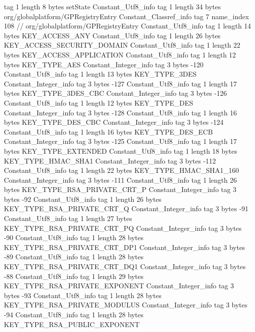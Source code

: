 {{{			tag	1
			length	8
			bytes	setState
		}
		Constant_Utf8_info {
			tag	1
			length	34
			bytes	org/globalplatform/GPRegistryEntry
		}
		Constant_Classref_info {
			tag	7
			name_index	108		// org/globalplatform/GPRegistryEntry
		}
		Constant_Utf8_info {
			tag	1
			length	14
			bytes	KEY_ACCESS_ANY
		}
		Constant_Utf8_info {
			tag	1
			length	26
			bytes	KEY_ACCESS_SECURITY_DOMAIN
		}
		Constant_Utf8_info {
			tag	1
			length	22
			bytes	KEY_ACCESS_APPLICATION
		}
		Constant_Utf8_info {
			tag	1
			length	12
			bytes	KEY_TYPE_AES
		}
		Constant_Integer_info {
			tag	3
			bytes	-120
		}
		Constant_Utf8_info {
			tag	1
			length	13
			bytes	KEY_TYPE_3DES
		}
		Constant_Integer_info {
			tag	3
			bytes	-127
		}
		Constant_Utf8_info {
			tag	1
			length	17
			bytes	KEY_TYPE_3DES_CBC
		}
		Constant_Integer_info {
			tag	3
			bytes	-126
		}
		Constant_Utf8_info {
			tag	1
			length	12
			bytes	KEY_TYPE_DES
		}
		Constant_Integer_info {
			tag	3
			bytes	-128
		}
		Constant_Utf8_info {
			tag	1
			length	16
			bytes	KEY_TYPE_DES_CBC
		}
		Constant_Integer_info {
			tag	3
			bytes	-124
		}
		Constant_Utf8_info {
			tag	1
			length	16
			bytes	KEY_TYPE_DES_ECB
		}
		Constant_Integer_info {
			tag	3
			bytes	-125
		}
		Constant_Utf8_info {
			tag	1
			length	17
			bytes	KEY_TYPE_EXTENDED
		}
		Constant_Utf8_info {
			tag	1
			length	18
			bytes	KEY_TYPE_HMAC_SHA1
		}
		Constant_Integer_info {
			tag	3
			bytes	-112
		}
		Constant_Utf8_info {
			tag	1
			length	22
			bytes	KEY_TYPE_HMAC_SHA1_160
		}
		Constant_Integer_info {
			tag	3
			bytes	-111
		}
		Constant_Utf8_info {
			tag	1
			length	26
			bytes	KEY_TYPE_RSA_PRIVATE_CRT_P
		}
		Constant_Integer_info {
			tag	3
			bytes	-92
		}
		Constant_Utf8_info {
			tag	1
			length	26
			bytes	KEY_TYPE_RSA_PRIVATE_CRT_Q
		}
		Constant_Integer_info {
			tag	3
			bytes	-91
		}
		Constant_Utf8_info {
			tag	1
			length	27
			bytes	KEY_TYPE_RSA_PRIVATE_CRT_PQ
		}
		Constant_Integer_info {
			tag	3
			bytes	-90
		}
		Constant_Utf8_info {
			tag	1
			length	28
			bytes	KEY_TYPE_RSA_PRIVATE_CRT_DP1
		}
		Constant_Integer_info {
			tag	3
			bytes	-89
		}
		Constant_Utf8_info {
			tag	1
			length	28
			bytes	KEY_TYPE_RSA_PRIVATE_CRT_DQ1
		}
		Constant_Integer_info {
			tag	3
			bytes	-88
		}
		Constant_Utf8_info {
			tag	1
			length	29
			bytes	KEY_TYPE_RSA_PRIVATE_EXPONENT
		}
		Constant_Integer_info {
			tag	3
			bytes	-93
		}
		Constant_Utf8_info {
			tag	1
			length	28
			bytes	KEY_TYPE_RSA_PRIVATE_MODULUS
		}
		Constant_Integer_info {
			tag	3
			bytes	-94
		}
		Constant_Utf8_info {
			tag	1
			length	28
			bytes	KEY_TYPE_RSA_PUBLIC_EXPONENT
}}}
